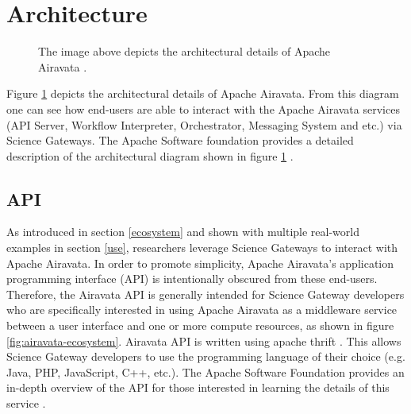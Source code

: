 \documentclass[9pt,twocolumn,twoside]{../../styles/osajnl}
\begin{document}
\section{Architecture} \label{architecture}
\begin{figure}[htbp]
\centering
{}
\caption{The image above depicts the architectural details of Apache
  Airavata \cite{www-documentation}.}
\label{fig:airavata-architecture}
\end{figure}
Figure \ref{fig:airavata-architecture} depicts the architectural
details of Apache Airavata. From this diagram one can see how
end-users are able to interact with the Apache Airavata services (API
Server, Workflow Interpreter, Orchestrator, Messaging System and etc.)
via Science Gateways. The Apache Software foundation provides a
detailed description of the architectural diagram shown in figure
\ref{fig:airavata-architecture} \cite{www-documentation}.

\subsection{API} \label{api}
As introduced in section \ref{ecosystem} and shown with multiple
real-world examples in section \ref{use}, researchers leverage Science
Gateways to interact with Apache Airavata. In order to promote
simplicity, Apache Airavata's application programming interface (API)
is intentionally obscured from these end-users. Therefore, the
Airavata API is generally intended for Science Gateway developers who
are specifically interested in using Apache Airavata as a middleware
service between a user interface and one or more compute resources, as
shown in figure \ref{fig:airavata-ecosystem}. Airavata API is written
using apache thrift \cite{www-documentation}. This allows Science
Gateway developers to use the programming language of their choice
(e.g. Java, PHP, JavaScript, C++, etc.). The Apache Software Foundation
provides an in-depth overview of the API for those interested in
learning the details of this service \cite{www-api}.
\end{document}
